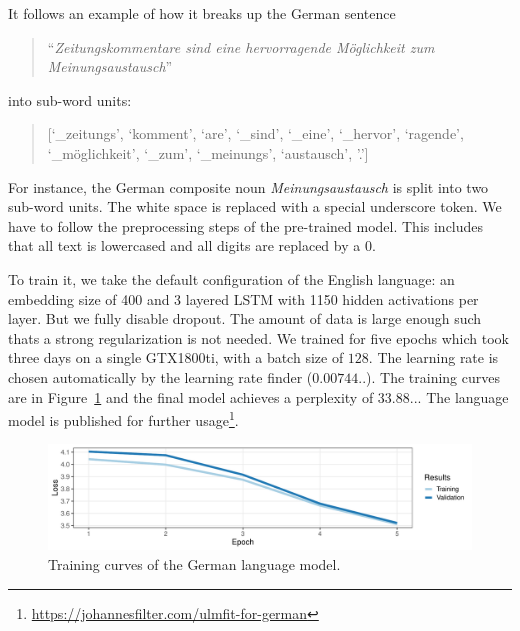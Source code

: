 \newpage

It follows an example of how it breaks up the German sentence
\begin{quote}
 ``\textit{Zeitungskommentare sind eine hervorragende M\"oglichkeit zum Meinungsaustausch}''
 \end{quote}
 into sub-word units:

\begin{quote}
	[`\_zeitungs',
 `komment',
 `are',
 `\_sind',
 `\_eine',
 `\_hervor',
 `ragende',
 `\_m\"oglichkeit',
 `\_zum',
 `\_meinungs',
 `austausch',
  '.']
\end{quote}

For instance, the German composite noun \textit{Meinungsaustausch} is split into two sub-word units. The white space is replaced with a special underscore token. We have to follow the preprocessing steps of the pre-trained model. This includes that all text is lowercased and all digits are replaced by a 0.

To train it, we take the default configuration of the English language:
an embedding size of 400 and 3 layered LSTM with 1150 hidden activations per layer.
But we fully disable dropout.
The amount of data is large enough such thats a strong regularization is not needed.
We trained for five epochs which took three days on a single GTX1800ti, with a batch size of $128$. The learning rate is chosen automatically by the learning rate finder ($0.00744..$). The training curves are in Figure~\ref{fig:germanlm} and the final model achieves a perplexity of $33.88..$. The language model is published for further usage\footnote{\url{https://johannesfilter.com/ulmfit-for-german}}.

 \begin{figure}
  \begin{center}
    \includegraphics[width=\textwidth]{graphs/experiments/german_lm}
  \end{center}
	\caption{Training curves of the German language model.}
   \label{fig:germanlm}
\end{figure}
